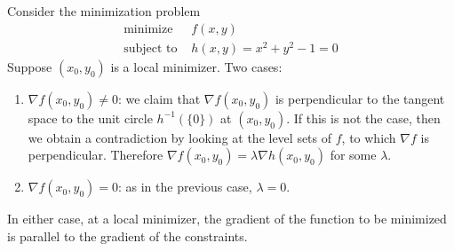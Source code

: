 \documentclass[11pt]{book}
\begin{document}
Consider the minimization problem
\begin{align*}
\text{minimize } &f(x,y) \\
\text{subject to } &h(x,y) = x^2 + y^2 - 1 = 0
\end{align*}
Suppose $(x_0, y_0)$ is a local minimizer. Two cases:
\begin{enumerate}
\item $\nabla f(x_0, y_0) \neq 0$: we claim that $\nabla f(x_0, y_0)$ is perpendicular to the tangent space to the unit circle $h^{-1}(\{0\})$ at $(x_0, y_0)$. If this is not the case, then we obtain a contradiction by looking at the level sets of $f$, to which $\nabla f$ is perpendicular. Therefore $\nabla f(x_0, y_0) = \lambda \nabla h(x_0, y_0)$ for some $\lambda$.

\item $\nabla f(x_0, y_0) = 0$: as in the previous case, $\lambda = 0$.
\end{enumerate}
In either case, at a local minimizer, the gradient of the function to be minimized is parallel to the gradient of the constraints.
\end{document}
